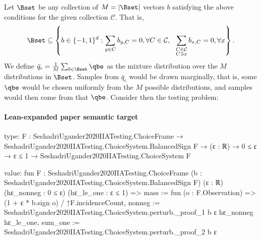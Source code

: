 \documentclass[10pt]{article}
\begin{document}
\begin{ReviewVerbatim}
	Let $\Bset$ be any collection of $M=|\Bset|$ vectors $b$ satisfying the above conditions for the given collection $\mathcal C$. That is,
	\begin{align}
	\label{eq:bset_full}
	\Bset \subseteq
	\left \{
	b \in \lbrace -1, 1 \rbrace^d
	:
	\sum_{y \in C} b_{y,C} = 0, \forall C \in \mathcal C,
	\ \
	\sum_{\substack{C \in \mathcal{C}\\ C \ni x}} b_{x,C} = 0, \forall x
	\right \}.
	\end{align}
	We define $\bar{q}_\epsilon = \frac{1}{M} \sum_{b \in \Bset} \qbe$ as the mixture distribution over the $M$ distributions in $\Bset$. Samples from $\bar{q}_\epsilon$ would be drawn marginally, that is, some $\qbe$ would be chosen uniformly from the $M$ possible distributions, and samples would then come from that $\qbe$. Consider then the testing problem:
\end{ReviewVerbatim}



\paragraph{Lean-expanded paper semantic target}
\begin{ReviewVerbatim}
type:
{F : SeshadriUgander2020IIATesting.ChoiceFrame} →
  SeshadriUgander2020IIATesting.ChoiceSystem.BalancedSign F →
    (ε : ℝ) → 0 ≤ ε → ε ≤ 1 → SeshadriUgander2020IIATesting.ChoiceSystem F

value:
fun {F : SeshadriUgander2020IIATesting.ChoiceFrame} (b : SeshadriUgander2020IIATesting.ChoiceSystem.BalancedSign F)
    (ε : ℝ) (hε_nonneg : 0 ≤ ε) (hε_le_one : ε ≤ 1) =>
  { mass := fun (o : F.Observation) => (1 + ε * b.sign o) / ↑F.incidenceCount,
    nonneg := SeshadriUgander2020IIATesting.ChoiceSystem.perturb._proof_1 b ε hε_nonneg hε_le_one,
    sum_one := SeshadriUgander2020IIATesting.ChoiceSystem.perturb._proof_2 b ε }
\end{ReviewVerbatim}
\end{document}
